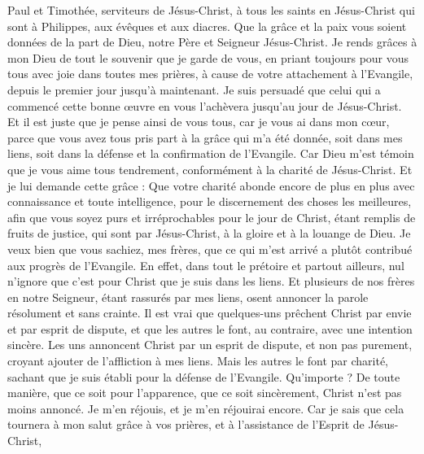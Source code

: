 \begin{multicols}{2}
\TextTitle{[Introduction]}
\VerseOne{}Paul et Timothée, serviteurs de Jésus-Christ, à tous les saints en Jésus-Christ qui sont à Philippes, aux évêques et aux diacres.
Que la grâce et la paix vous soient données de la part de Dieu, notre Père et Seigneur Jésus-Christ.
Je rends grâces à mon Dieu de tout le souvenir que je garde de vous,
en priant toujours pour vous tous avec joie dans toutes mes prières,
à cause de votre attachement à l'Evangile, depuis le premier jour jusqu'à maintenant.
Je suis persuadé que celui qui a commencé cette bonne œuvre en vous l'achèvera jusqu'au jour de Jésus-Christ.
Et il est juste que je pense ainsi de vous tous, car je vous ai dans mon cœur, parce que vous avez tous pris part à la grâce qui m’a été donnée, soit dans mes liens, soit dans la défense et la confirmation de l'Evangile.
Car Dieu m'est témoin que je vous aime tous tendrement, conformément à la charité de Jésus-Christ.
Et je lui demande cette grâce : Que votre charité abonde encore de plus en plus avec connaissance et toute intelligence,
pour le discernement des choses les meilleures, afin que vous soyez purs et irréprochables pour le jour de Christ,
étant remplis de fruits de justice, qui sont par Jésus-Christ, à la gloire et à la louange de Dieu.
Je veux bien que vous sachiez, mes frères, que ce qui m’est arrivé a plutôt contribué aux progrès de l'Evangile.
En effet, dans tout le prétoire et partout ailleurs, nul n’ignore que c’est pour Christ que je suis dans les liens.
Et plusieurs de nos frères en notre Seigneur, étant rassurés par mes liens, osent annoncer la parole résolument et sans crainte.
Il est vrai que quelques-uns prêchent Christ par envie et par esprit de dispute, et que les autres le font, au contraire, avec une intention sincère.
Les uns annoncent Christ par un esprit de dispute, et non pas purement, croyant ajouter de l'affliction à mes liens.
Mais les autres le font par charité, sachant que je suis établi pour la défense de l'Evangile.
Qu’importe ? De toute manière, que ce soit pour l’apparence, que ce soit sincèrement, Christ n’est pas moins annoncé. Je m’en réjouis, et je m’en réjouirai encore.
Car je sais que cela tournera à mon salut grâce à vos prières, et à l’assistance de l'Esprit de Jésus-Christ,

\end{multicols}
